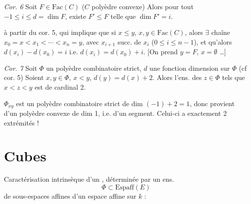 \documentclass[11pt,a4paper]{article}
\begin{document}

\emph{Cor. 6} Soit $F \in \mathrm{Fac}(C)$ ($C$ polyèdre convexe) Alors pour
tout $-1 \leq i \leq d = \dim F$, existe $F' \leq F$ telle que
$\dim F' = i$.

 

 à partir du cor. 5, qui implique que si $x \leq y$,
$x, y \in \mathrm{Fac}(C)$, alors $\exists$ chaîne
$x_0 = x < x_1 < \cdots < x_n = y$, avec $x_{i+1}$ succ. de $x_i$
($0 \leq i \leq n-1$), et qu'alors 
\struck{\ill{}} $d(x_i) - d(x_0) = i$ i.e. $d(x_i) = d(x_0) + i$.
[On prend $y = F$, $x = \emptyset$ …]

\emph{Cor. 7} Soit $\Phi$ un polyèdre combinatoire strict, $d$ une fonction
dimension sur $\Phi$ (cf cor. 5) Soient $x, y \in \Phi$, $x < y$,
$d(y) = d(x) + 2$. Alors l'ens. des $z \in \Phi$ tels que $x < z < y$ est de
cardinal 2.

$\Phi_{xy}$ est un polyèdre combinatoire strict de dim $(-1) + 2 = 1$, donc
provient d'un polyèdre convexe de dim 1, i.e. d'un segment. Celui-ci a
exactement 2 extrémités !

\section{Cubes}



Caractérisation intrinsèque d'un , déterminée par un ens.
\[
  \Phi \subset \mathrm{Espaff}(E)
\]
de sous-espaces affines d'un espace affine sur $k$ :
\end{document}
